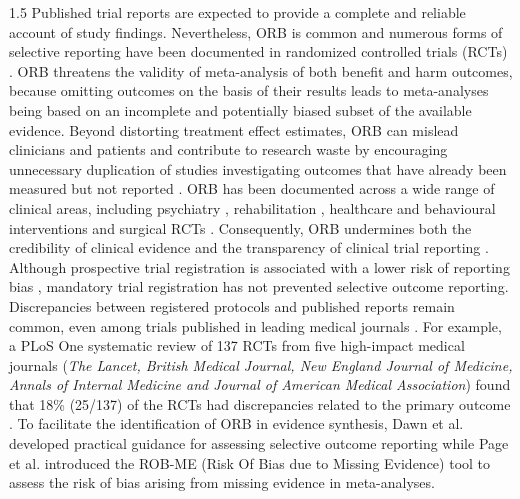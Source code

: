 \documentclass{article}
\begin{document}
\begin{spacing}{1.5}
Published trial reports are expected to provide a complete and reliable account of study findings. Nevertheless, ORB is common \cite{chan2004outcome, beurden2021selective, ward2022outcome} and numerous forms of selective reporting have been documented in randomized controlled trials (RCTs) \cite{page2013many}. ORB threatens the validity of meta-analysis of both benefit \cite{kirkham2010impact} and harm \cite{saini2014selective} outcomes, because omitting outcomes on the basis of their results leads to meta-analyses being based on an incomplete and potentially biased subset of the available evidence. Beyond distorting treatment effect estimates, ORB can mislead clinicians and patients and contribute to research waste by encouraging unnecessary duplication of studies investigating outcomes that have already been measured but not reported \cite{chan2014increasing, glasziou2014reducing, thomas2022catalogue, butcher2020outcome}. ORB has been documented across a wide range of clinical areas, including psychiatry \cite{lancee2017outcome, shinohara2015protocol}, rehabilitation \cite{wang2023has}, healthcare and behavioural interventions \cite{page2014bias, matvienko2024selective, lancee2022selective, milette2011transparency} and surgical RCTs \cite{komukai2024publication}. Consequently, ORB undermines both the credibility of clinical evidence \cite{ioannidis2014clinical, frosi2015multivariate, littell2023protocol} and the transparency of clinical trial reporting \cite{souza2023selective}.
Although prospective trial registration is associated with a lower risk of reporting bias \cite{silva2024many, chan2017association, zhang2025threat}, mandatory trial registration has not prevented selective outcome reporting. Discrepancies between registered protocols and published reports remain common, even among trials published in leading medical journals \cite{jones2015comparison, howard2017systematic}. For example, a PLoS One systematic review of 137 RCTs from five high-impact medical journals (\textit{The Lancet, British Medical Journal, New England Journal of Medicine, Annals of Internal Medicine and Journal of American Medical Association}) found that 18\% (25/137) of the RCTs  had discrepancies related to the primary outcome \cite{fleming2015outcome}. To facilitate the identification of ORB in evidence synthesis, Dawn et al. \cite{dwan2010assessing} developed practical guidance for assessing selective outcome reporting while Page et al. \cite{page2023rob} introduced the ROB-ME (Risk Of Bias due to Missing Evidence) tool to assess the risk of bias arising from missing evidence in meta-analyses.  


\end{spacing}
\end{document}
